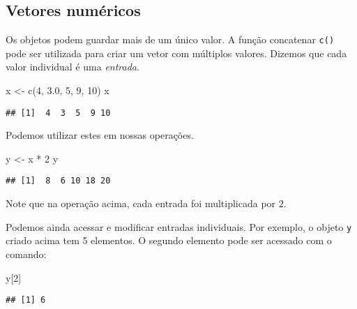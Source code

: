 \documentclass[
]{book}
\newenvironment{Shaded}{\begin{snugshade}}{\end{snugshade}}
\newcommand{\DecValTok}[1]{\textcolor[rgb]{0.00,0.00,0.81}{#1}}
\newcommand{\FloatTok}[1]{\textcolor[rgb]{0.00,0.00,0.81}{#1}}
\newcommand{\FunctionTok}[1]{\textcolor[rgb]{0.00,0.00,0.00}{#1}}
\newcommand{\NormalTok}[1]{#1}
\newcommand{\OtherTok}[1]{\textcolor[rgb]{0.56,0.35,0.01}{#1}}
\newcommand{\SpecialCharTok}[1]{\textcolor[rgb]{0.00,0.00,0.00}{#1}}
\begin{document}
\hypertarget{vetores-numuxe9ricos}{%
\subsection{Vetores numéricos}\label{vetores-numuxe9ricos}}

Os objetos podem guardar mais de um único valor. A função concatenar \texttt{c()} pode ser utilizada para criar um vetor com múltiplos valores. Dizemos que cada valor individual é uma \emph{entrada}.

\begin{Shaded}
\begin{Highlighting}[]
\NormalTok{x }\OtherTok{\textless{}{-}} \FunctionTok{c}\NormalTok{(}\DecValTok{4}\NormalTok{, }\FloatTok{3.0}\NormalTok{, }\DecValTok{5}\NormalTok{, }\DecValTok{9}\NormalTok{, }\DecValTok{10}\NormalTok{)}
\NormalTok{x}
\end{Highlighting}
\end{Shaded}

\begin{verbatim}
## [1]  4  3  5  9 10
\end{verbatim}

Podemos utilizar estes em nossas operações.

\begin{Shaded}
\begin{Highlighting}[]
\NormalTok{y }\OtherTok{\textless{}{-}}\NormalTok{ x }\SpecialCharTok{*} \DecValTok{2}
\NormalTok{y}
\end{Highlighting}
\end{Shaded}

\begin{verbatim}
## [1]  8  6 10 18 20
\end{verbatim}

Note que na operação acima, cada entrada foi multiplicada por \(2\).

Podemos ainda acessar e modificar entradas individuais. Por exemplo, o objeto \texttt{y} criado acima tem 5 elementos. O segundo elemento pode ser acessado com o comando:

\begin{Shaded}
\begin{Highlighting}[]
\NormalTok{y[}\DecValTok{2}\NormalTok{]}
\end{Highlighting}
\end{Shaded}

\begin{verbatim}
## [1] 6
\end{verbatim}
\end{document}
